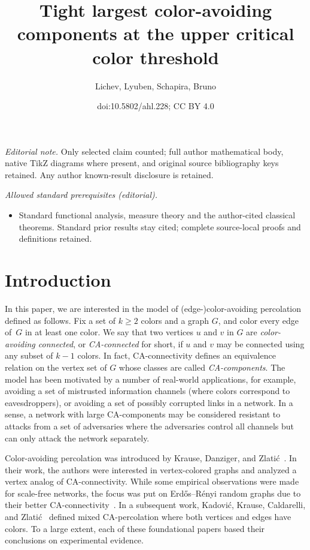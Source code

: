 \documentclass[10pt]{amsart}
\title{Tight largest color-avoiding components at the upper critical color threshold}
\author{Lichev, Lyuben, Schapira, Bruno}
\date{doi:10.5802/ahl.228; CC BY 4.0}
\theoremstyle{definition}\newtheorem{defi}[theo]{Definition}\newtheorem{rema}[theo]{Remark}\newtheorem{exam}[theo]{Example}\newtheorem{exem}[theo]{Example}\newtheorem{nota}[theo]{Notation}
\begin{document}
\maketitle
\noindent\textit{Editorial note.} Only selected claim counted; full author mathematical body, native TikZ diagrams where present, and original source bibliography keys retained. Any author known-result disclosure is retained.\par\medskip
\noindent\textit{Allowed standard prerequisites (editorial).}\begin{itemize}
\item Standard functional analysis, measure theory and the author-cited classical theorems. Standard prior results stay cited; complete source-local proofs and definitions retained.
\end{itemize}\medskip

\section{Introduction}

In this paper, we are interested in the model of (edge-)color-avoiding percolation defined as follows. Fix a set of $k\ge 2$ colors and a graph $G$, and color every edge of~$G$ in at least one color. We say that two vertices $u$ and $v$ in $G$ are \emph{color-avoiding connected}, or \emph{CA-connected} for short, if $u$ and $v$ may be connected using any subset of $k-1$ colors. In fact, CA-connectivity defines an equivalence relation on the vertex set of $G$ whose classes are called \emph{CA-components}. The model has been motivated by a number of real-world applications, for example, avoiding a set of mistrusted information channels (where colors correspond to eavesdroppers), or avoiding a set of possibly corrupted links in a network. In a sense, a network with large CA-components may be considered resistant to attacks from a set of adversaries where the adversaries control all channels but can only attack the network separately.

Color-avoiding percolation was introduced by Krause, Danziger, and Zlati\'c~\cite{KDZ16, KDZ17}. In their work, the authors were interested in vertex-colored graphs and analyzed a vertex analog of CA-connectivity. While some empirical observations were made for scale-free networks, the focus was put on Erd\H{o}s--Rényi random graphs due to their better CA-connectivity~\cite{KDZ16}. In a subsequent work, Kadovi\'c, Krause, Caldarelli, and Zlati\'c~\cite{KKCZ18} defined mixed CA-percolation where both vertices and edges have colors. To a large extent, each of these foundational papers based their conclusions on experimental evidence.
\end{document}
